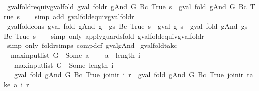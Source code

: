 \begin{isabellebody}
{\isafoldproof}%
%
\isadelimproof
\isanewline
%
\endisadelimproof
\isanewline
{}\isamarkupfalse%
\ gval{\isacharunderscore}foldr{\isacharunderscore}equiv{\isacharunderscore}gval{\isacharunderscore}fold{\isacharcolon}\ {\isachardoublequoteopen}gval\ {\isacharparenleft}foldr\ gAnd\ G\ {\isacharparenleft}Bc\ True{\isacharparenright}{\isacharparenright}\ s\ {\isacharequal}\ gval\ {\isacharparenleft}fold\ gAnd\ G\ {\isacharparenleft}Bc\ True{\isacharparenright}{\isacharparenright}\ s{\isachardoublequoteclose}\isanewline
%
\isadelimproof
\ \ %
\endisadelimproof
%
\isatagproof
{}\isamarkupfalse%
\ {\isacharparenleft}simp\ add{\isacharcolon}\ gval{\isacharunderscore}fold{\isacharunderscore}equiv{\isacharunderscore}gval{\isacharunderscore}foldr{\isacharparenright}%
\endisatagproof
{\isafoldproof}%
%
\isadelimproof
\isanewline
%
\endisadelimproof
\isanewline
{}\isamarkupfalse%
\ gval{\isacharunderscore}fold{\isacharunderscore}cons{\isacharcolon}\ {\isachardoublequoteopen}gval\ {\isacharparenleft}fold\ gAnd\ {\isacharparenleft}g\ {\isacharhash}\ gs{\isacharparenright}\ {\isacharparenleft}Bc\ True{\isacharparenright}{\isacharparenright}\ s\ {\isacharequal}\ gval\ g\ s\ {\isasymand}\isactrlsub {\isacharquery}\ gval\ {\isacharparenleft}fold\ gAnd\ gs\ {\isacharparenleft}Bc\ True{\isacharparenright}{\isacharparenright}\ s{\isachardoublequoteclose}\isanewline
%
\isadelimproof
\ \ %
\endisadelimproof
%
\isatagproof
{}\isamarkupfalse%
\ {\isacharparenleft}simp\ only{\isacharcolon}\ apply{\isacharunderscore}guards{\isacharunderscore}fold\ gval{\isacharunderscore}fold{\isacharunderscore}equiv{\isacharunderscore}gval{\isacharunderscore}foldr{\isacharparenright}\isanewline
\ \ \isamarkupfalse%
\ {\isacharparenleft}simp\ only{\isacharcolon}\ foldr{\isachardot}simps\ comp{\isacharunderscore}def\ gval{\isacharunderscore}gAnd{\isacharparenright}%
\endisatagproof
{\isafoldproof}%
%
\isadelimproof
\isanewline
%
\endisadelimproof
\isanewline
{}\isamarkupfalse%
\ gval{\isacharunderscore}fold{\isacharunderscore}take{\isacharcolon}\isanewline
\ \ {\isachardoublequoteopen}max{\isacharunderscore}input{\isacharunderscore}list\ G\ {\isacharless}\ Some\ a\ {\isasymLongrightarrow}\isanewline
\ \ \ a\ {\isasymle}\ length\ i\ {\isasymLongrightarrow}\isanewline
\ \ \ max{\isacharunderscore}input{\isacharunderscore}list\ G\ {\isasymle}\ Some\ {\isacharparenleft}length\ i{\isacharparenright}\ {\isasymLongrightarrow}\isanewline
\ \ \ gval\ {\isacharparenleft}fold\ gAnd\ G\ {\isacharparenleft}Bc\ True{\isacharparenright}{\isacharparenright}\ {\isacharparenleft}join{\isacharunderscore}ir\ i\ r{\isacharparenright}\ {\isacharequal}\ gval\ {\isacharparenleft}fold\ gAnd\ G\ {\isacharparenleft}Bc\ True{\isacharparenright}{\isacharparenright}\ {\isacharparenleft}join{\isacharunderscore}ir\ {\isacharparenleft}take\ a\ i{\isacharparenright}\ r{\isacharparenright}{\isachardoublequoteclose}\isanewline

\end{isabellebody}
